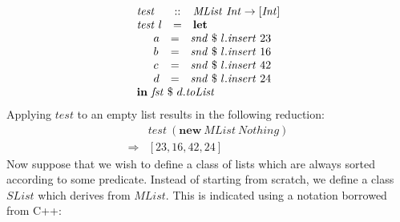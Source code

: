 \documentclass[runningheads,a4paper]{llncs}
\begin{document}
\begin{displaymath}
\begin{array}{lcl}
\mathit{test} & :: & \mathit{MList}~\mathit{Int} \to [\mathit{Int}]\\
\mathit{test}~l & = & \mathbf{let} \\
\multicolumn{3}{l}{\quad \begin{array}{lcl}
a & = & \mathit{snd}~\$~l.\mathit{insert}~23\\
b & = & \mathit{snd}~\$~l.\mathit{insert}~16\\
c & = & \mathit{snd}~\$~l.\mathit{insert}~42\\
d & = & \mathit{snd}~\$~l.\mathit{insert}~24\\
\end{array}}\\
\multicolumn{3}{l}{\mathbf{in}~\mathit{fst}~\$~d.\mathit{toList}}
\end{array}
\end{displaymath}
Applying $\mathit{test}$ to an empty list results in the following reduction:
\begin{displaymath}
\begin{array}{cl}
 & \mathit{test}~(\mathbf{new}~\mathit{MList}~\mathit{Nothing}) \\
\Rightarrow & [23,16,42,24]
\end{array}
\end{displaymath}
Now suppose that we wish to define a class of lists which are always sorted according to some predicate. Instead of starting from scratch, we define a class $\mathit{SList}$ which derives from $\mathit{MList}$. This is indicated using a notation borrowed from C++:
\end{document}
